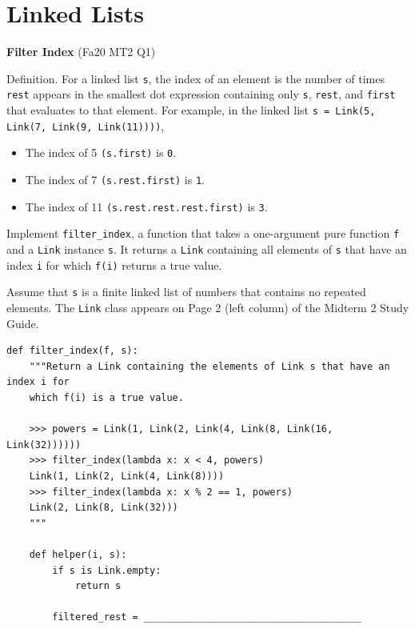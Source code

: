 \documentclass{exam}
\newlength{\currentparskip}
\newenvironment{blocksection}
{
    \setlength{\currentparskip}{\parskip}%
    \begin{minipage}{\linewidth}
    \setlength{\parskip}{\currentparskip}%
}
{
    \end{minipage}
}
\begin{document}
\section{Linked Lists}
\begin{questions}

\begin{blocksection}
\question \textbf{Filter Index} (Fa20 MT2 Q1)

    Definition. For a linked list \lstinline{s}, the index of an element is the number of times \lstinline{rest} appears in the smallest
    dot expression containing only \lstinline{s}, \lstinline{rest}, and \lstinline{first} that evaluates to that element. For example, in the
    linked list \lstinline{s = Link(5, Link(7, Link(9, Link(11))))},
    
    \begin{itemize}
        \item The index of 5 \lstinline{(s.first)} is \lstinline{0}.
        \item The index of 7 \lstinline{(s.rest.first)} is \lstinline{1}.
        \item The index of 11 \lstinline{(s.rest.rest.rest.first)} is \lstinline{3}.
    \end{itemize}
    
    Implement \lstinline{filter_index}, a function that takes a one-argument pure function \lstinline{f} and a \lstinline{Link} instance \lstinline{s}. It
    returns a \lstinline{Link} containing all elements of \lstinline{s} that have an index \lstinline{i} for which \lstinline{f(i)} returns a true value.
    
    Assume that \lstinline{s} is a finite linked list of numbers that contains no repeated elements. The \lstinline{Link} class appears
    on Page 2 (left column) of the Midterm 2 Study Guide.
\begin{lstlisting}
def filter_index(f, s):
    """Return a Link containing the elements of Link s that have an index i for
    which f(i) is a true value.
    
    >>> powers = Link(1, Link(2, Link(4, Link(8, Link(16, Link(32))))))
    >>> filter_index(lambda x: x < 4, powers)
    Link(1, Link(2, Link(4, Link(8))))
    >>> filter_index(lambda x: x % 2 == 1, powers)
    Link(2, Link(8, Link(32)))
    """
    
    def helper(i, s):
        if s is Link.empty:
            return s

        filtered_rest = ______________________________________


\end{lstlisting}
\end{blocksection}
\end{questions}
\end{document}
